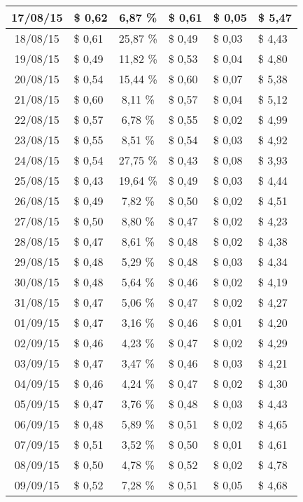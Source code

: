 \begin{center}
\begin{small}
\begin{longtable}{|c|l|c|l|l|l|}
17/08/15 & \$ 0,62 & 6,87 \% & \$ 0,61 & \$ 0,05 & \$ 5,47 \\ \hline
18/08/15 & \$ 0,61 & 25,87 \% & \$ 0,49 & \$ 0,03 & \$ 4,43 \\ \hline
19/08/15 & \$ 0,49 & 11,82 \% & \$ 0,53 & \$ 0,04 & \$ 4,80 \\ \hline
20/08/15 & \$ 0,54 & 15,44 \% & \$ 0,60 & \$ 0,07 & \$ 5,38 \\ \hline
21/08/15 & \$ 0,60 & 8,11 \% & \$ 0,57 & \$ 0,04 & \$ 5,12 \\ \hline
22/08/15 & \$ 0,57 & 6,78 \% & \$ 0,55 & \$ 0,02 & \$ 4,99 \\ \hline
23/08/15 & \$ 0,55 & 8,51 \% & \$ 0,54 & \$ 0,03 & \$ 4,92 \\ \hline
24/08/15 & \$ 0,54 & 27,75 \% & \$ 0,43 & \$ 0,08 & \$ 3,93 \\ \hline
25/08/15 & \$ 0,43 & 19,64 \% & \$ 0,49 & \$ 0,03 & \$ 4,44 \\ \hline
26/08/15 & \$ 0,49 & 7,82 \% & \$ 0,50 & \$ 0,02 & \$ 4,51 \\ \hline
27/08/15 & \$ 0,50 & 8,80 \% & \$ 0,47 & \$ 0,02 & \$ 4,23 \\ \hline
28/08/15 & \$ 0,47 & 8,61 \% & \$ 0,48 & \$ 0,02 & \$ 4,38 \\ \hline
29/08/15 & \$ 0,48 & 5,29 \% & \$ 0,48 & \$ 0,03 & \$ 4,34 \\ \hline
30/08/15 & \$ 0,48 & 5,64 \% & \$ 0,46 & \$ 0,02 & \$ 4,19 \\ \hline
31/08/15 & \$ 0,47 & 5,06 \% & \$ 0,47 & \$ 0,02 & \$ 4,27 \\ \hline
01/09/15 & \$ 0,47 & 3,16 \% & \$ 0,46 & \$ 0,01 & \$ 4,20 \\ \hline
02/09/15 & \$ 0,46 & 4,23 \% & \$ 0,47 & \$ 0,02 & \$ 4,29 \\ \hline
03/09/15 & \$ 0,47 & 3,47 \% & \$ 0,46 & \$ 0,03 & \$ 4,21 \\ \hline
04/09/15 & \$ 0,46 & 4,24 \% & \$ 0,47 & \$ 0,02 & \$ 4,30 \\ \hline
05/09/15 & \$ 0,47 & 3,76 \% & \$ 0,48 & \$ 0,03 & \$ 4,43 \\ \hline
06/09/15 & \$ 0,48 & 5,89 \% & \$ 0,51 & \$ 0,02 & \$ 4,65 \\ \hline
07/09/15 & \$ 0,51 & 3,52 \% & \$ 0,50 & \$ 0,01 & \$ 4,61 \\ \hline
08/09/15 & \$ 0,50 & 4,78 \% & \$ 0,52 & \$ 0,02 & \$ 4,78 \\ \hline
09/09/15 & \$ 0,52 & 7,28 \% & \$ 0,51 & \$ 0,05 & \$ 4,68 \\ \hline

\end{longtable}
\end{small}
\end{center}
